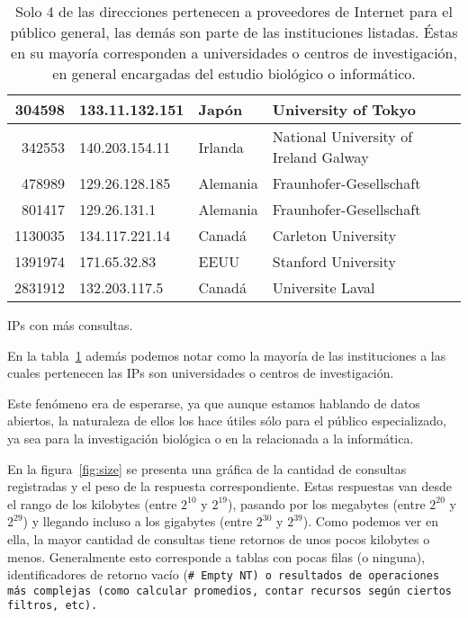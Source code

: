 \begin{table}[ht]
\begin{tabular}{|r|l|l|l|}
    304598  & 133.11.132.151  & Japón          
                   & University of Tokyo\\\hline
    342553  & 140.203.154.11  & Irlanda        
                   & National University of Ireland Galway\\\hline
    478989  & 129.26.128.185  & Alemania       
                   & Fraunhofer-Gesellschaft\\\hline
    801417  & 129.26.131.1    & Alemania       
                   & Fraunhofer-Gesellschaft\\\hline
    1130035 & 134.117.221.14  & Canadá         
                   & Carleton University\\\hline
    1391974 & 171.65.32.83    & EEUU 
                   & Stanford University\\\hline
    2831912 & 132.203.117.5   & Canadá         
                   & Universite Laval\\\hline
  \end{tabular}
  \caption{IPs con más consultas.}\label{tab:ips}
  \vspace{-.2cm}
  \caption*{\small
    Solo 4 de las direcciones pertenecen a proveedores de Internet para el
    público general, las demás son parte de las instituciones listadas.
    Éstas en su mayoría corresponden a universidades o centros de investigación,
    en general encargadas del estudio biológico o informático.
  }
\end{table}

En la tabla~\ref{tab:ips} además podemos notar como la mayoría de las
instituciones a las cuales pertenecen las IPs son universidades o centros de
investigación.

Este fenómeno era de esperarse, ya que aunque estamos hablando de datos abiertos,
la naturaleza de ellos los hace útiles sólo para el público especializado, ya
sea para la investigación biológica o en la relacionada a la informática.

En la figura~\ref{fig:size} se presenta una gráfica de la cantidad de consultas
registradas y el peso de la respuesta correspondiente. Estas respuestas van
desde el rango de los kilobytes (entre $2^{10}$ y $2^{19}$), pasando por los
megabytes (entre $2^{20}$ y $2^{29}$) y llegando incluso a los gigabytes (entre
$2^{30}$ y  $2^{39}$).
Como podemos ver en ella, la mayor cantidad de consultas tiene retornos de unos
pocos kilobytes o menos.
Generalmente esto corresponde a tablas con pocas filas (o ninguna),
identificadores de retorno vacío (\tt{\# Empty NT}) o resultados de operaciones
más complejas (como calcular promedios, contar recursos según ciertos filtros,
etc).


